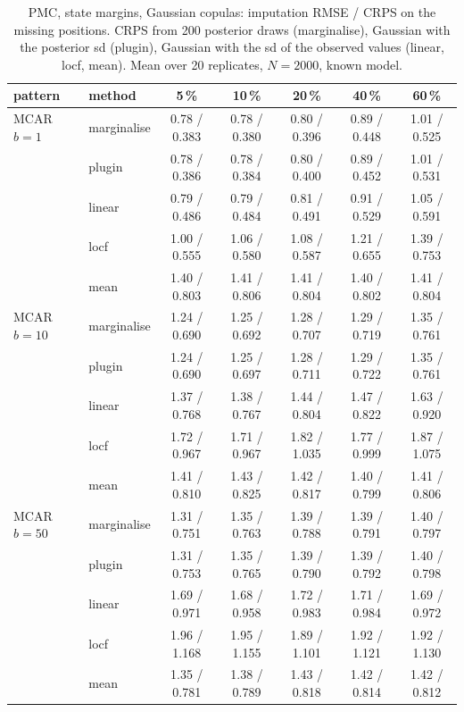 \begin{table}[htbp]
  \centering
  \small
  \setlength{\tabcolsep}{4pt}
  \caption{PMC, state margins, Gaussian copulas: imputation RMSE / CRPS on the missing positions. CRPS from 200 posterior draws (marginalise), Gaussian with the posterior sd (plugin), Gaussian with the sd of the observed values (linear, locf, mean). Mean over 20 replicates, $N = 2000$, known model.}
  \label{tab:missing-imp-pmc_gauss_k2}
  \begin{tabular}{llccccc}
    \toprule
    pattern & method & 5\,\% & 10\,\% & 20\,\% & 40\,\% & 60\,\% \\
    \midrule
    MCAR $b{=}1$ & marginalise & 0.78 / 0.383 & 0.78 / 0.380 & 0.80 / 0.396 & 0.89 / 0.448 & 1.01 / 0.525 \\
     & plugin & 0.78 / 0.386 & 0.78 / 0.384 & 0.80 / 0.400 & 0.89 / 0.452 & 1.01 / 0.531 \\
     & linear & 0.79 / 0.486 & 0.79 / 0.484 & 0.81 / 0.491 & 0.91 / 0.529 & 1.05 / 0.591 \\
     & locf & 1.00 / 0.555 & 1.06 / 0.580 & 1.08 / 0.587 & 1.21 / 0.655 & 1.39 / 0.753 \\
     & mean & 1.40 / 0.803 & 1.41 / 0.806 & 1.41 / 0.804 & 1.40 / 0.802 & 1.41 / 0.804 \\
    \addlinespace
    MCAR $b{=}10$ & marginalise & 1.24 / 0.690 & 1.25 / 0.692 & 1.28 / 0.707 & 1.29 / 0.719 & 1.35 / 0.761 \\
     & plugin & 1.24 / 0.690 & 1.25 / 0.697 & 1.28 / 0.711 & 1.29 / 0.722 & 1.35 / 0.761 \\
     & linear & 1.37 / 0.768 & 1.38 / 0.767 & 1.44 / 0.804 & 1.47 / 0.822 & 1.63 / 0.920 \\
     & locf & 1.72 / 0.967 & 1.71 / 0.967 & 1.82 / 1.035 & 1.77 / 0.999 & 1.87 / 1.075 \\
     & mean & 1.41 / 0.810 & 1.43 / 0.825 & 1.42 / 0.817 & 1.40 / 0.799 & 1.41 / 0.806 \\
    \addlinespace
    MCAR $b{=}50$ & marginalise & 1.31 / 0.751 & 1.35 / 0.763 & 1.39 / 0.788 & 1.39 / 0.791 & 1.40 / 0.797 \\
     & plugin & 1.31 / 0.753 & 1.35 / 0.765 & 1.39 / 0.790 & 1.39 / 0.792 & 1.40 / 0.798 \\
     & linear & 1.69 / 0.971 & 1.68 / 0.958 & 1.72 / 0.983 & 1.71 / 0.984 & 1.69 / 0.972 \\
     & locf & 1.96 / 1.168 & 1.95 / 1.155 & 1.89 / 1.101 & 1.92 / 1.121 & 1.92 / 1.130 \\
     & mean & 1.35 / 0.781 & 1.38 / 0.789 & 1.43 / 0.818 & 1.42 / 0.814 & 1.42 / 0.812 \\

\end{tabular}
\end{table}
